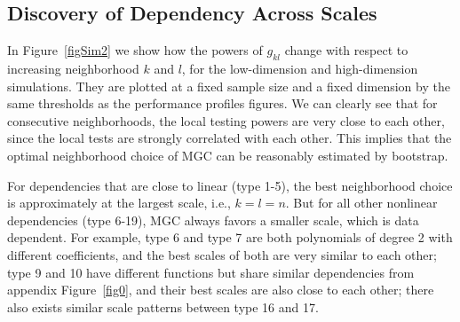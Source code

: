 \documentclass[11pt]{article}
\begin{document}
\subsection{Discovery of Dependency Across Scales}


In Figure~\ref{figSim2} we show how the powers of $g_{kl}$ change with respect to increasing neighborhood $k$ and $l$, for the low-dimension and high-dimension simulations. They are plotted at a fixed sample size and a fixed dimension by the same thresholds as the performance profiles figures. We can clearly see that for consecutive neighborhoods, the local testing powers are very close to each other, since the local tests are strongly correlated with each other. This implies that the optimal neighborhood choice of MGC can be reasonably estimated by bootstrap.

For dependencies that are close to linear (type 1-5), the best neighborhood choice is approximately at the largest scale, i.e., $k=l=n$. But for all other nonlinear dependencies (type 6-19), MGC always favors a smaller scale, which is data dependent. For example, type 6 and type 7 are both polynomials of degree 2 with different coefficients, and the best scales of both are very similar to each other; type 9 and 10 have different functions but share similar dependencies from appendix Figure~\ref{fig0}, and their best scales are also close to each other; there also exists similar scale patterns between type 16 and 17.
\end{document}
